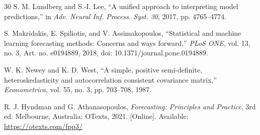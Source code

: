 \begin{thebibliography}{30}
 S. M. Lundberg and S.-I. Lee, ``A unified approach to interpreting model predictions,'' in \emph{Adv. Neural Inf. Process. Syst. 30}, 2017, pp. 4765--4774.

 S. Makridakis, E. Spiliotis, and V. Assimakopoulos, ``Statistical and machine learning forecasting methods: Concerns and ways forward,'' \emph{PLoS ONE}, vol. 13, no. 3, Art. no. e0194889, 2018, doi: 10.1371/journal.pone.0194889.

 W. K. Newey and K. D. West, ``A simple, positive semi-definite, heteroskedasticity and autocorrelation consistent covariance matrix,'' \emph{Econometrica}, vol. 55, no. 3, pp. 703--708, 1987.

 R. J. Hyndman and G. Athanasopoulos, \emph{Forecasting: Principles and Practice}, 3rd ed. Melbourne, Australia: OTexts, 2021. [Online]. Available: \url{https://otexts.com/fpp3/}

\end{thebibliography}

